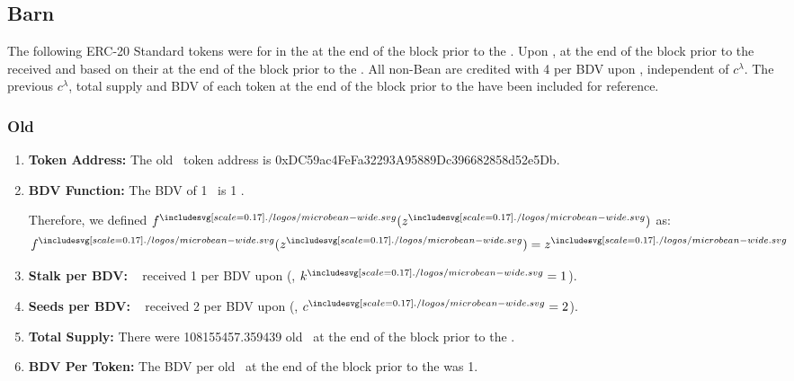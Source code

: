 \documentclass[class=article, crop=false]{standalone}
\begin{document}
\subsection{Barn}
\vspace*{-1.5mm}
The following ERC-20 Standard tokens were  for  in the  at the end of the block prior to the . Upon ,  at the end of the block prior to the  received  and  based on their  at the end of the block prior to the . All non-Bean  are credited with 4  per BDV upon , independent of \hyperlink{ht32}{$c^{\lambda}$}. The previous \hyperlink{ht32}{$c^{\lambda}$}, total supply and BDV of each token at the end of the block prior to the  have been included for reference. 

\vspace*{-1.5mm}
\subsubsection{Old \Bean}
\vspace*{-1.5mm}
\begin{enumerate}
        \item \textbf{Token Address:} The old \Bean\ token address is 0xDC59ac4FeFa32293A95889Dc396682858d52e5Db.
        \item \textbf{BDV Function:} The BDV of 1 \Bean\ is 1 \Bean. 
        
Therefore, we defined $f^{\bean}(z^{\bean})$ as:
            $$f^{\bean}(z^{\bean}) = z^{\bean}$$
        \item \textbf{Stalk per BDV:} \Bean\  received 1  per BDV upon  (, $k^{\bean} = 1$).
        \item \textbf{Seeds per BDV:} \Bean\  received 2  per BDV upon  (, $c^{\bean} = 2$).
        \item \textbf{Total Supply:} There were 108155457.359439 old \Bean\ at the end of the block prior to the .
        \item \textbf{BDV Per Token:} The BDV per old \Bean\ at the end of the block prior to the  was 1.
    \end{enumerate}

\vspace{-1.5mm}
\end{document}
